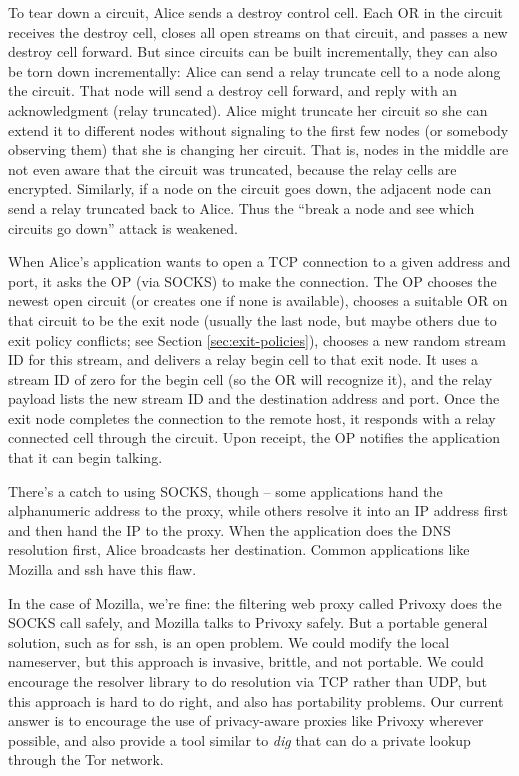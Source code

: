\documentclass[times,10pt,twocolumn]{article}
\begin{document}
To tear down a circuit, Alice sends a destroy control cell. Each OR
in the circuit receives the destroy cell, closes all open streams on
that circuit, and passes a new destroy cell forward. But since circuits
can be built incrementally, they can also be torn down incrementally:
Alice can send a relay truncate cell to a node along the circuit. That
node will send a destroy cell forward, and reply with an acknowledgment
(relay truncated). Alice might truncate her circuit so she can extend it
to different nodes without signaling to the first few nodes (or somebody
observing them) that she is changing her circuit. That is, nodes in the
middle are not even aware that the circuit was truncated, because the
relay cells are encrypted. Similarly, if a node on the circuit goes down,
the adjacent node can send a relay truncated back to Alice. Thus the
``break a node and see which circuits go down'' attack is weakened.

\label{subsec:tcp}

When Alice's application wants to open a TCP connection to a given
address and port, it asks the OP (via SOCKS) to make the connection. The
OP chooses the newest open circuit (or creates one if none is available),
chooses a suitable OR on that circuit to be the exit node (usually the
last node, but maybe others due to exit policy conflicts; see Section
\ref{sec:exit-policies}), chooses a new random stream ID for this stream,
and delivers a relay begin cell to that exit node. It uses a stream ID
of zero for the begin cell (so the OR will recognize it), and the relay
payload lists the new stream ID and the destination address and port.
Once the exit node completes the connection to the remote host, it
responds with a relay connected cell through the circuit. Upon receipt,
the OP notifies the application that it can begin talking.

There's a catch to using SOCKS, though -- some applications hand the
alphanumeric address to the proxy, while others resolve it into an IP
address first and then hand the IP to the proxy. When the application
does the DNS resolution first, Alice broadcasts her destination. Common
applications like Mozilla and ssh have this flaw.

In the case of Mozilla, we're fine: the filtering web proxy called Privoxy
does the SOCKS call safely, and Mozilla talks to Privoxy safely. But a
portable general solution, such as for ssh, is an open problem. We could
modify the local nameserver, but this approach is invasive, brittle, and
not portable. We could encourage the resolver library to do resolution
via TCP rather than UDP, but this approach is hard to do right, and also
has portability problems. Our current answer is to encourage the use of
privacy-aware proxies like Privoxy wherever possible, and also provide
a tool similar to \emph{dig} that can do a private lookup through the
Tor network.
\end{document}
